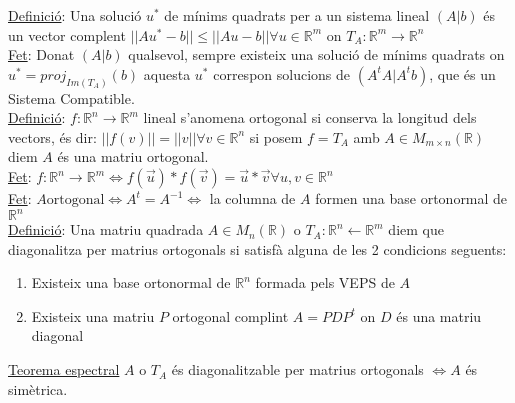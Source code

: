 \underline{Definició}: Una solució $u^*$ de mínims quadrats per a un sistema lineal $(A|b)$ és un vector complent $||Au^*-b|| \leq ||Au-b|| \forall u \in \mathbb{R}^m$ on $T_A: \mathbb{R}^m \rightarrow \mathbb{R}^n$\\
\underline{Fet}: Donat $(A|b)$ qualsevol, sempre existeix una solució de mínims quadrats on $u^* = proj_{Im(T_A)}(b)$ aquesta $u^*$ correspon solucions de $(A^tA|A^tb)$, que és un Sistema Compatible.\\
\underline{Definició}: $f: \mathbb{R}^n \rightarrow \mathbb{R}^m$ lineal s'anomena ortogonal si conserva la longitud dels vectors, és dir: $||f(v)||=||v|| \forall v \in \mathbb{R}^n$ si posem $f=T_A$ amb $A \in M_{m\times n}(\mathbb{R})$ diem $A$ és una matriu ortogonal.\\
\underline{Fet}: $f: \mathbb{R}^n \rightarrow \mathbb{R}^m \Leftrightarrow f(\vec{u})*f(\vec{v}) = \vec{u}*\vec{v} \forall u, v \in \mathbb{R}^n$ \\
\underline{Fet}: $A \text{ortogonal} \Leftrightarrow A^t=A^{-1} \Leftrightarrow$ la columna de $A$ formen una base ortonormal de $\mathbb{R}^n$\\
\underline{Definició}: Una matriu quadrada $A \in M_n(\mathbb{R})$ o $T_A: \mathbb{R}^n \leftarrow \mathbb{R}^m$ diem que diagonalitza per matrius ortogonals si satisfà alguna de les 2 condicions seguents:
\begin{enumerate}
    \item Existeix una base ortonormal de $\mathbb{R}^n$ formada pels VEPS de $A$
    \item Existeix una matriu $P$ ortogonal complint $A=PDP^t$ on $D$ és una matriu diagonal
\end{enumerate}
\underline{Teorema espectral} $A$ o $T_A$ és diagonalitzable per matrius ortogonals $\Leftrightarrow A$ és simètrica.
\newpage